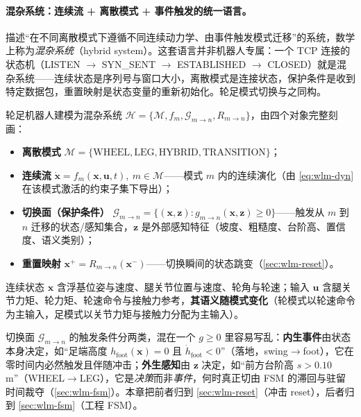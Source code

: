 \paragraph{混杂系统：连续流 + 离散模式 + 事件触发的统一语言。}
描述“在不同离散模式下遵循不同连续动力学、由事件触发模式迁移”的系统，数学上称为\emph{混杂系统}（hybrid system）。这套语言并非机器人专属：一个 TCP 连接的状态机（LISTEN $\to$ SYN\_SENT $\to$ ESTABLISHED $\to$ CLOSED）就是混杂系统——连续状态是序列号与窗口大小，离散模式是连接状态，保护条件是收到特定数据包，重置映射是状态变量的重新初始化。轮足模式切换与之同构。

\begin{definition}[轮足混杂系统]\label{def:wlm-hybrid}
轮足机器人建模为混杂系统 $\mathcal H=\{\mathcal M,f_m,\mathcal G_{m\to n},R_{m\to n}\}$，由四个对象完整刻画：
\begin{itemize}
  \item \textbf{离散模式} $\mathcal M=\{\mathrm{WHEEL},\mathrm{LEG},\mathrm{HYBRID},\mathrm{TRANSITION}\}$；
  \item \textbf{连续流} $\dot{\mathbf x}=f_m(\mathbf x,\mathbf u,t),\ m\in\mathcal M$——模式 $m$ 内的连续演化（由 \cref{eq:wlm-dyn} 在该模式激活的约束子集下导出）；
  \item \textbf{切换面（保护条件）} $\mathcal G_{m\to n}=\{(\mathbf x,\mathbf z):g_{m\to n}(\mathbf x,\mathbf z)\ge0\}$——触发从 $m$ 到 $n$ 迁移的状态/感知集合，$\mathbf z$ 是外部感知特征（坡度、粗糙度、台阶高、置信度、语义类别）；
  \item \textbf{重置映射} $\mathbf x^+=R_{m\to n}(\mathbf x^-)$——切换瞬间的状态跳变（\cref{sec:wlm-reset}）。
\end{itemize}
连续状态 $\mathbf x$ 含浮基位姿与速度、腿关节位置与速度、轮角与轮速；输入 $\mathbf u$ 含腿关节力矩、轮力矩、轮速命令与接触力参考，\textbf{其语义随模式变化}（轮模式以轮速命令为主输入，足模式以关节力矩与接触力分配为主输入）。
\end{definition}

\begin{note}\label{note:wlm-guard-two}
切换面 $\mathcal G_{m\to n}$ 的触发条件分两类，混在一个 $g\ge0$ 里容易写乱：\textbf{内生事件}由状态本身决定，如“足端高度 $h_{\mathrm{foot}}(\mathbf x)=0$ 且 $\dot h_{\mathrm{foot}}<0$”（落地，swing$\to$foot），它在零时间内必然触发且伴随冲击；\textbf{外生感知}由 $\mathbf z$ 决定，如“前方台阶高 $s>0.10\,$m”（WHEEL$\to$LEG），它是\emph{决策}而非\emph{事件}，何时真正切由 FSM 的滞回与驻留时间裁夺（\cref{sec:wlm-fsm}）。本章把前者归到 \cref{sec:wlm-reset}（冲击 reset），后者归到 \cref{sec:wlm-fsm}（工程 FSM）。
\end{note}

